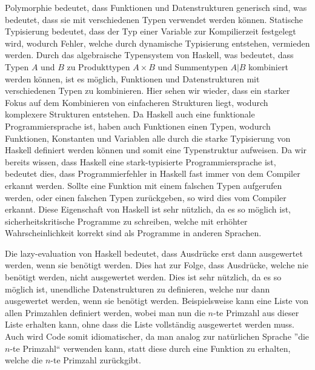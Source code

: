 \documentclass{hhuarticle}
\theoremstyle{definition}
\theoremstyle{theorem}
\begin{document}
  Polymorphie bedeutet, dass Funktionen und Datenstrukturen
  generisch sind, was bedeutet, dass sie mit verschiedenen Typen verwendet werden können.
  Statische Typisierung bedeutet, dass der Typ einer Variable
  zur Kompilierzeit festgelegt wird, wodurch Fehler, welche durch
  dynamische Typisierung entstehen, vermieden werden. Durch das
  algebraische Typensystem von Haskell, was bedeutet, dass Typen $A$ und
  $B$ zu Produkttypen $A \times B$ und Summentypen $A | B$ kombiniert werden können,
  ist es möglich, Funktionen und Datenstrukturen mit verschiedenen
  Typen zu kombinieren. Hier sehen wir wieder, dass ein starker Fokus
  auf dem Kombinieren von einfacheren Strukturen liegt, wodurch komplexere
  Strukturen entstehen. Da Haskell auch eine funktionale Programmiersprache ist,
  haben auch Funktionen einen Typen, wodurch Funktionen, Konstanten und Variablen
  alle durch die starke Typisierung von Haskell definiert werden können
  und somit eine Typenstruktur aufweisen. Da wir bereits wissen, dass
  Haskell eine stark-typisierte Programmiersprache ist, bedeutet dies,
  dass Programmierfehler in Haskell fast immer von dem Compiler erkannt werden.
  Sollte eine Funktion mit einem falschen Typen aufgerufen werden, oder
  einen falschen Typen zurückgeben, so wird dies vom Compiler erkannt.
  Diese Eigenschaft von Haskell ist sehr nützlich, da es so möglich ist,
  sicherheitskritische Programme zu schreiben, welche mit erhöhter
  Wahrscheinlichkeit korrekt sind als Programme in anderen Sprachen.

  Die lazy-evaluation von Haskell bedeutet, dass Ausdrücke erst dann
  ausgewertet werden, wenn sie benötigt werden. Dies hat zur Folge,
  dass Ausdrücke, welche nie benötigt werden, nicht ausgewertet werden.
  Dies ist sehr nützlich, da es so möglich ist, unendliche Datenstrukturen
  zu definieren, welche nur dann ausgewertet werden, wenn sie benötigt werden.
  Beispielsweise kann eine Liste von allen Primzahlen definiert werden,
  wobei man nun die $n$-te Primzahl aus dieser Liste erhalten kann,
  ohne dass die Liste vollständig ausgewertet werden muss.
  Auch wird Code somit idiomatischer, da man analog zur natürlichen
  Sprache ''die $n$-te Primzahl`` verwenden kann, statt diese
  durch eine Funktion zu erhalten, welche die $n$-te Primzahl zurückgibt.
\end{document}
